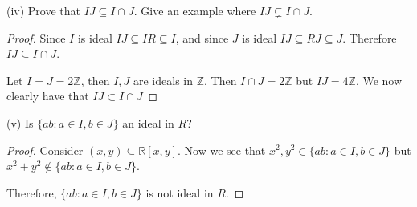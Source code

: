\documentclass{article}
\newcommand{\Z}{\mathbb{Z}}
\newcommand{\R}{\mathbb{R}}
\newenvironment{hwproof}[1]
{
    #1
    \begin{proof}
}{
    \end{proof}
}
\begin{document}
\begin{hwproof}
    {
        (iv) Prove that $IJ \subseteq I \cap J$. Give an example where
        $IJ \subsetneq I \cap J$.
    }
    Since $I$ is ideal $IJ \subseteq IR \subseteq I$, and since $J$ is ideal
    $IJ \subseteq RJ \subseteq J$. Therefore $IJ \subseteq I \cap J$.

    Let $I = J = 2\Z$, then $I, J$ are ideals in $\Z$. Then $I\cap J = 2\Z$ but
    $IJ = 4\Z$. We now clearly have that $IJ \subset I\cap J$

\end{hwproof}

\begin{hwproof}
    {
        (v) Is $\{ab : a \in I, b \in J\}$ an ideal in $R$?
    }
    Consider $(x,y) \subseteq \R[x,y]$. Now we see that
    $x^2, y^2 \in \{ab : a \in I, b \in J\}$ but
    $x^2 + y^2 \notin \{ab : a \in I, b \in J\}$.

    Therefore, $\{ab : a \in I, b \in J\}$ is not ideal in $R$.

\end{hwproof}
\end{document}
